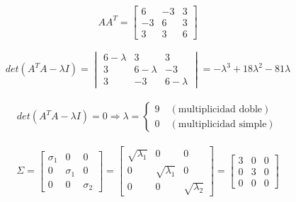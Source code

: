 \documentclass[a4paper, spanish]{article}
\begin{document}
  \begin{equation}
    AA^T =
    \begin{bmatrix}
      6 & -3 & 3 \\
      -3 & 6 & 3 \\
      3 & 3 & 6
    \end{bmatrix}
  \end{equation}


  \begin{align}
    det(A^T A - \lambda I)
    = \begin{vmatrix}
      6-\lambda & 3 & 3 \\
      3 & 6-\lambda & -3 \\
      3 & -3 & 6-\lambda
    \end{vmatrix}
    = -\lambda^3 + 18 \lambda ^ 2 - 81 \lambda
  \end{align}


  \begin{align}
    det(A^T A - \lambda I) = 0
    \Rightarrow
    \lambda =
    \begin{cases}
    9 \quad (\text{multiplicidad doble}) \\
    0 \quad (\text{multiplicidad simple})
    \end{cases}
  \end{align}

  \begin{align}
    \Sigma =
    \begin{bmatrix}
      \sigma_1 & 0  & 0\\
      0 & \sigma_1  & 0 \\
      0 & 0 & \sigma_2
    \end{bmatrix}
    =
    \begin{bmatrix}
      \sqrt{\lambda_1} & 0 & 0 \\
      0 & \sqrt{\lambda_1} & 0\\
      0 & 0 & \sqrt{\lambda_2}
    \end{bmatrix} =
    \begin{bmatrix}
      3 & 0 & 0 \\
      0 & 3 & 0 \\
      0 & 0 & 0
    \end{bmatrix}
  \end{align}
\end{document}
